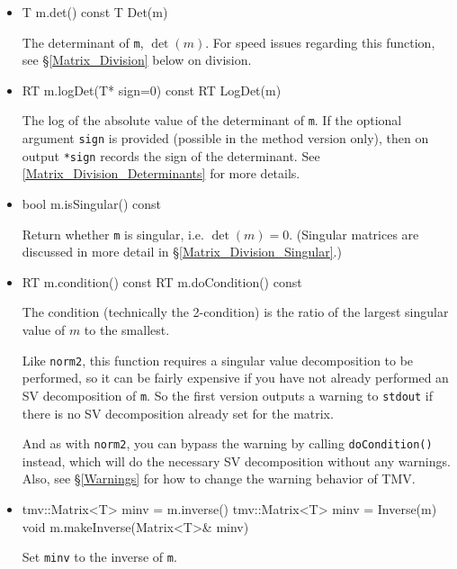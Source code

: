 \documentclass[twoside,letterpaper,11pt]{article}
\renewcommand{\tt}[1]{{\lstinline {#1}}}
\begin{document}
\begin{itemize}
\item
\begin{tmvcode}
T m.det() const
T Det(m)
\end{tmvcode}
The determinant of \tt{m}, $\det(m)$.  For speed issues regarding this function, see 
\S\ref{Matrix_Division} below on division.

\item
\begin{tmvcode}
RT m.logDet(T* sign=0) const
RT LogDet(m)
\end{tmvcode}
The log of the absolute value of the determinant of \tt{m}.  If the optional argument \tt{sign} is 
provided (possible in the method version only), then on output \tt{*sign} records the sign of the determinant.  See \ref{Matrix_Division_Determinants} 
for more details.

\item
\begin{tmvcode}
bool m.isSingular() const
\end{tmvcode}
Return whether \tt{m} is singular, i.e. $\det(m) = 0$.
(Singular matrices are discussed in more detail in \S\ref{Matrix_Division_Singular}.)

\item
\begin{tmvcode}
RT m.condition() const
RT m.doCondition() const
\end{tmvcode}
The condition (technically the 2-condition) is 
the ratio of the largest singular value of $m$ to the smallest.

Like \tt{norm2}, this function requires a singular value decomposition to be performed,
so it can be fairly expensive if you have not
already performed an SV decomposition of \tt{m}.
So the first version
outputs a warning to \tt{stdout} if there is no SV decomposition already set for the matrix.

And as with \tt{norm2}, you can bypass the warning by calling \tt{doCondition()} instead,
which will do the necessary SV decomposition without any warnings.  
Also, see \S\ref{Warnings} for how to change the warning behavior of TMV.

\item
\begin{tmvcode}
tmv::Matrix<T> minv = m.inverse()
tmv::Matrix<T> minv = Inverse(m)
void m.makeInverse(Matrix<T>& minv)
\end{tmvcode}
Set \tt{minv} to the inverse of \tt{m}.  


\end{itemize}
\end{document}
